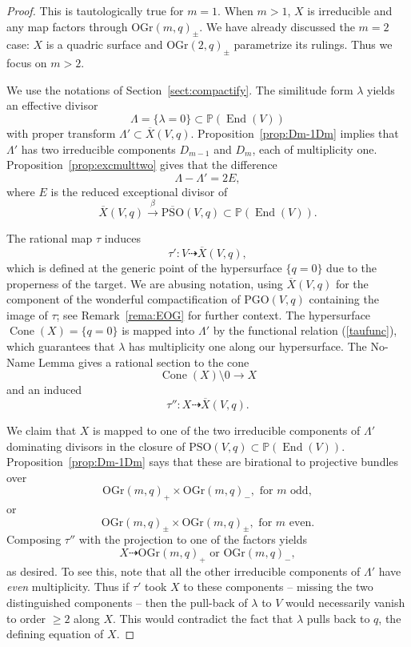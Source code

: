 \documentclass[12pt]{amsart}
\numberwithin{equation}{section}
\newcommand{\ra}{\rightarrow}
\newcommand{\bP}{\mathbb{P}}
\newcommand{\oX}{\overline{X}}
\newcommand{\Cone}{\operatorname{Cone}}
\newcommand{\End}{\operatorname{End}}
\newcommand{\OGr}{\mathrm{OGr}}
\newcommand{\oPSO}{\overline{\mathrm{PSO}}}
\newcommand{\PGO}{\mathrm{PGO}}
\newcommand{\PSO}{\mathrm{PSO}}
\theoremstyle{plain}
\theoremstyle{definition}
\theoremstyle{remark}
\begin{document}
\begin{proof} 
This is tautologically true for $m=1$.
When $m>1$, $X$ is irreducible and any map factors through $\OGr(m,q)_{\pm}$. We have
already discussed the $m=2$ case:
$X$ is a quadric surface and $\OGr(2,q)_{\pm}$
parametrize its rulings. Thus we focus on $m>2$.  

We use the notations of Section~\ref{sect:compactify}.
The similitude form $\lambda$ yields an effective divisor $$\Lambda=\{\lambda=0\} \subset \bP(\End(V))$$
with proper transform $\Lambda' \subset \oX(V,q)$.
Proposition~\ref{prop:Dm-1Dm}
implies that $\Lambda'$ has two irreducible components
$D_{m-1}$ and $D_m$, each of multiplicity one. 
Proposition~\ref{prop:excmulttwo} gives that the difference
$$
\Lambda - \Lambda' = 2E,
$$
where $E$ is the reduced exceptional divisor of
$$\oX(V,q) \stackrel{\beta}{\longrightarrow} \oPSO(V,q) \subset \bP(\End(V)).$$

The rational map $\tau$ induces 
$$\tau': V \dashrightarrow \oX(V,q),$$
which is defined at the generic point of the
hypersurface $\{q=0\}$ due to the properness of the target.
We are abusing notation, using $\oX(V,q)$ for the
component of the wonderful compactification of $\PGO(V,q)$
containing the image of $\tau$; see Remark~\ref{rema:EOG}
for further context.
The hypersurface $\Cone(X)=\{q=0\}$ is mapped into $\Lambda'$ by
the functional relation (\ref{taufunc}),
which guarantees that $\lambda$ has 
multiplicity one along our hypersurface.  
The No-Name Lemma 
gives a rational section to the cone 
$$\Cone(X) \setminus 0 \ra X$$
and an induced 
$$\tau'': X \dashrightarrow \oX(V,q).$$

We claim that $X$ is mapped to one of the two irreducible components of $\Lambda'$ dominating divisors in the closure 
of $\PSO(V,q) \subset \bP(\End(V))$. 
Proposition~\ref{prop:Dm-1Dm} says that these 
are birational to projective bundles over
$$\OGr(m,q)_+ \times \OGr(m,q)_- ,\text{ for $m$ odd},
$$
or 
$$\OGr(m,q)_{\pm} \times \OGr(m,q)_{\pm},  \text{ for $m$ even.}
$$
Composing $\tau''$
with the projection to one of the factors yields
$$X \dashrightarrow \OGr(m,q)_+ \text{ or } \OGr(m,q)_-, 
$$
as desired.
To see this, note that all the other irreducible components of $\Lambda'$ have {\em even} multiplicity. 
Thus if $\tau'$ took $X$ to these components -- missing the
two distinguished components -- then the
pull-back of $\lambda$ to $V$ would necessarily vanish
to order $\ge 2$ along $X$. This would contradict the
fact that $\lambda$ pulls back to $q$, the defining equation
of $X$.  
\end{proof}
\end{document}
